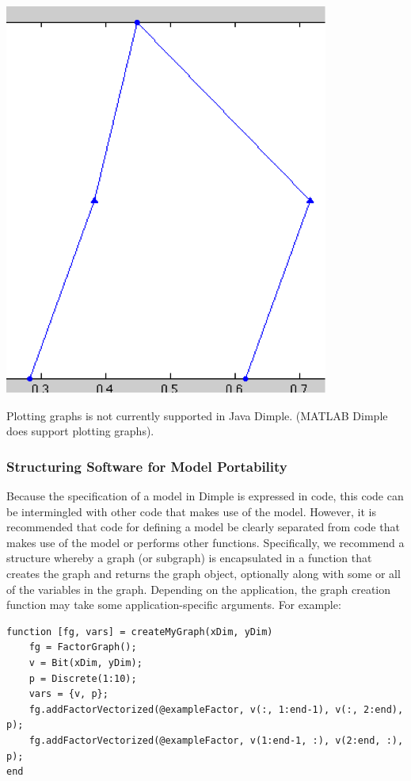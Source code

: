 \includegraphics{images/plot16.png}

\fi

\ifjava
Plotting graphs is not currently supported in Java Dimple.  (MATLAB Dimple does support plotting graphs).  
\fi


\subsubsection{Structuring Software for Model Portability}

Because the specification of a model in Dimple is expressed in code, this code can be intermingled with other code that makes use of the model.  However, it is recommended that code for defining a model be clearly separated from code that makes use of the model or performs other functions.  Specifically, we recommend a structure whereby a graph (or subgraph) is encapsulated in a function that creates the graph and returns the graph object, optionally along with some or all of the variables in the graph.  Depending on the application, the graph creation function may take some application-specific arguments.  For example:

\ifmatlab

\begin{lstlisting}
function [fg, vars] = createMyGraph(xDim, yDim)
	fg = FactorGraph();
	v = Bit(xDim, yDim);
	p = Discrete(1:10);
	vars = {v, p};
	fg.addFactorVectorized(@exampleFactor, v(:, 1:end-1), v(:, 2:end), p);
	fg.addFactorVectorized(@exampleFactor, v(1:end-1, :), v(2:end, :), p);
end
\end{lstlisting}

